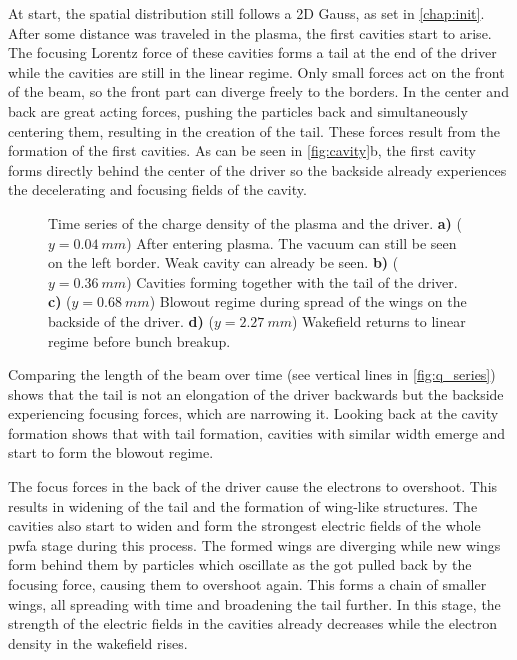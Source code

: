 \documentclass[bachelor_thesis]{subfiles}
\begin{document}
At start, the spatial distribution still follows a 2D Gauss, as set in \autoref{chap:init}. After some distance was traveled in the plasma, the first cavities start to arise. The focusing Lorentz force of these cavities forms a tail at the end of the driver while the cavities are still in the linear regime.
Only small forces act on the front of the beam, so the front part can diverge freely to the borders. In the center and back are great acting forces, pushing the particles back and simultaneously centering them, resulting in the creation of the tail.
These forces result from the formation of the first cavities. As can be seen in \autoref{fig:cavity}b, the first cavity forms directly behind the center of the driver so the backside already experiences the decelerating and focusing fields of the cavity.
\begin{figure}
	\centering
	
	\caption{Time series of the charge density of the plasma and the driver.
	\textbf{a)} ($y=\qty{0.04}{mm}$) After entering plasma. The vacuum can still be seen on the left border. Weak cavity can already be seen.
	\textbf{b)} ($y=\qty{0.36}{mm}$) Cavities forming together with the tail of the driver.
	\textbf{c)} ($y=\qty{0.68}{mm}$) Blowout regime during spread of the wings on the backside of the driver.
	\textbf{d)} ($y=\qty{2.27}{mm}$) Wakefield returns to linear regime before bunch breakup.}
	\label{fig:cavity}
\end{figure}
Comparing the length of the beam over time (see vertical lines in \autoref{fig:q_series}) shows that the tail is not an elongation of the driver backwards but the backside experiencing focusing forces, which are narrowing it.
Looking back at the cavity formation shows that with tail formation, cavities with similar width emerge and start to form the blowout regime.

The focus forces in the back of the driver cause the electrons to overshoot. This results in widening of the tail and the formation of wing-like structures. The cavities also start to widen and form the strongest electric fields of the whole \gls{pwfa} stage during this process.
The formed wings are diverging while new wings form behind them by particles which oscillate as the got pulled back by the focusing force, causing them to overshoot again. This forms a chain of smaller wings, all spreading with time and broadening the tail further.
In this stage, the strength of the electric fields in the cavities already decreases while the electron density in the wakefield rises.
\end{document}
